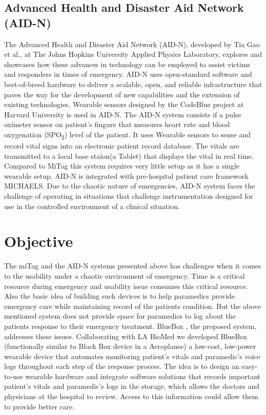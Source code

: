 \subsection{Advanced Health
	and Disaster Aid Network (AID-N)}
The Advanced Health and Disaster Aid Network (AID-N), developed by Tia Gao et al., \cite{AID-N} at The Johns Hopkins University Applied Physics Laboratory, explores and showcases how these advances in technology can be employed to assist victims and responders in times of emergency. AID-N uses open-standard software and best-of-breed hardware to deliver a scalable, open, and reliable infrastructure that paves the way for the development of new capabilities and the extension of existing technologies. 
Wearable sensors designed by the CodeBlue project at Harvard University is used in AID-N. The AID-N system consists if a pulse oximeter sensor on patient's fingure that measures heart rate and blood oxygenation (SPO\textsubscript{2}) level of the patient. It uses Wearable sensors to sense and record vital signs into an electronic patient record database. The vitals are transmitted to a local base staion(a Tablet) that displays the vital in real time. Compared to MiTag this system requires very little setup as it has a single wearable setup. AID-N is integrated with pre-hospital patient care framework MICHAELS. Due to the chaotic nature of emergencies, AID-N system
faces the challenge of operating in situations that challenge instrumentation designed for use in
the controlled environment of a clinical situation. 


\section{Objective}
The miTag and the AID-N systems presented above has challenges when it comes to the usability under a chaotic environment of emergency. Time is a critical resource during emergency and usability issue consumes this critical resource. Also the basic idea of building such devices is to help paramedics provide emergency care while maintaining record of the patients condition. But the above mentioned system does not provide space for paramedics to log about the patients response to their emergency treatment. BlueBox , the proposed system, addresses these issues. Collaborating with LA BioMed we developed BlueBox (functionally similar to Black Box device in a Aeroplanes) a low-cost, low-power wearable device that automates monitoring patient’s vitals and paramedic's voice logs throughout each step of the response process. The idea is to design an easy-to-use wearable hardware and integrate software solutions that records important patient’s vitals and paramedic's logs in the storage, which allows the doctors and physicians at the hospital to review. Access to this information could allow them to provide better care.

